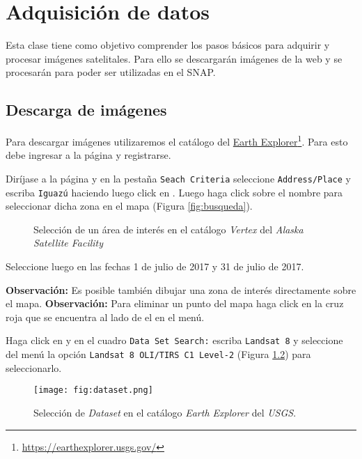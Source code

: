 \chapter{Adquisición de datos}

Esta clase tiene como objetivo comprender los pasos básicos para adquirir y procesar imágenes satelitales. Para ello se descargarán imágenes de la web y se procesarán para poder ser utilizadas en el SNAP.

\section{Descarga de imágenes}

Para descargar imágenes utilizaremos el catálogo del \href{https://earthexplorer.usgs.gov/}{Earth Explorer}\footnote{\href{https://earthexplorer.usgs.gov/}{https://earthexplorer.usgs.gov/}}. Para esto debe ingresar a la página y registrarse.


Diríjase a la página y en la pestaña \texttt{Seach Criteria} seleccione \texttt{Address/Place} y escriba \texttt{Iguazú} haciendo luego click en  . Luego haga click sobre el nombre  para seleccionar dicha zona en el mapa (Figura \ref{fig:busqueda}).

\begin{figure}[h!]
    \centering
    \caption{Selección de un área de interés en el catálogo \emph{Vertex} del \emph{Alaska Satellite Facility}}
    \label{fig:region}
\end{figure}

Seleccione luego en  las fechas 1 de julio de 2017 y 31 de julio de 2017.

\textbf{Observación:} Es posible también dibujar una zona de interés directamente sobre el mapa.
\textbf{Observación:} Para eliminar un punto del mapa haga click en la cruz roja que se encuentra al lado de el en el menú.

Haga click en  y en el cuadro \texttt{Data Set Search:} escriba \texttt{Landsat 8} y seleccione del menú la opción \texttt{Landsat 8 OLI/TIRS C1 Level-2} (Figura \ref{fig:dataset}) para seleccionarlo.

\begin{figure}[h!]
    \centering
    \texttt{[image: fig:dataset.png]}
    \caption{Selección de \emph{Dataset} en el catálogo \emph{Earth Explorer} del \emph{USGS}.}
    \label{fig:dataset}
\end{figure}

